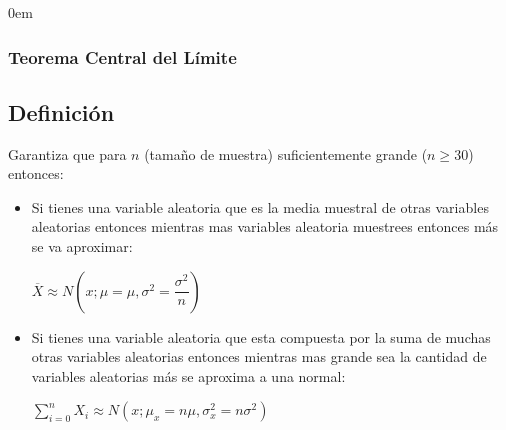 \documentclass[12pt, fleqn]{report}                             %
\newenvironment{SmallIndentation}[1][0.75em]                    %
        {\begin{adjustwidth}{#1}{}\begin{footnotesize}}             %
        {\end{footnotesize}\end{adjustwidth}}                       %
\newcommand \Over {\overline}                                   %
\theoremstyle{break}                                            %
\begin{document}
                \begin{multicols}{2}
                \begin{SmallIndentation}[0em]
                    
                    \subsubsection{Teorema Central del Límite}

                        \subsection{Definición}

                            Garantiza que para $n$ (tamaño de muestra) suficientemente grande ($n \geq 30$)
                            entonces:

                            \begin{itemize}
                                \item 
                                    Si tienes una variable aleatoria que es la media muestral de otras variables aleatorias entonces
                                    mientras mas variables aleatoria muestrees entonces más se va aproximar:

                                    $\Over{X} \approx N(x; \mu = \mu, \sigma^2 = \dfrac{\sigma^2}{n})$
                                
                                \item 
                                    Si tienes una variable aleatoria que esta compuesta por la suma de muchas otras variables
                                    aleatorias entonces mientras mas grande sea la cantidad de variables aleatorias más se
                                    aproxima a una normal:

                                    $\sum_{i=0}^n X_i \approx N(x; \mu_x = n \mu, \sigma^2_x = n\sigma^2)$
                            \end{itemize}



\end{SmallIndentation}
\end{multicols}
\end{document}
